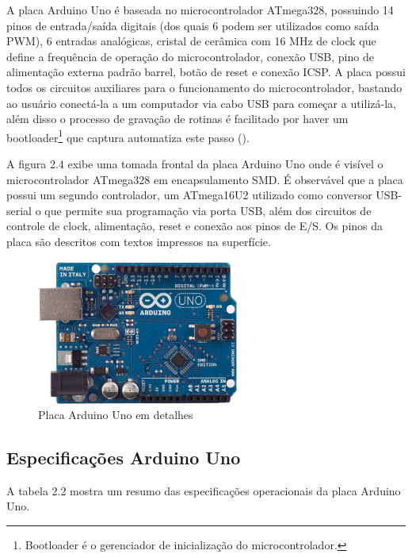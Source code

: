 A placa Arduino Uno é baseada no microcontrolador ATmega328, possuindo 14 pinos de entrada/saída digitais (dos quais 6 podem ser utilizados como saída PWM), 6 entradas analógicas, cristal de cerâmica com 16 MHz de clock que define a frequência de operação do microcontrolador, conexão USB, pino de alimentação externa padrão barrel, botão de reset e conexão ICSP. A placa possui todos os circuitos auxiliares para o funcionamento do microcontrolador, bastando ao usuário conectá-la a um computador via cabo USB para começar a utilizá-la, além disso o processo de gravação de rotinas é facilitado por haver um bootloader\footnote{Bootloader é o gerenciador de inicialização do microcontrolador.} que captura automatiza este passo (\textcite{arduino_specs:2013}).

A figura 2.4 exibe uma tomada frontal da placa Arduino Uno onde é visível o microcontrolador ATmega328 em encapsulamento SMD. É observável que a placa possui um segundo controlador, um ATmega16U2 utilizado como conversor USB-serial o que permite sua programação via porta USB, além dos circuitos de controle de clock, alimentação, reset e conexão aos pinos de E/S. Os pinos da placa são descritos com textos impressos na superfície.

\begin{figure}[h!]
			\centering
			\includegraphics[width=0.6\textwidth]{figures/arduinoUnoFront.jpg}
			\caption{Placa Arduino Uno em detalhes}
			\label{1}
\end{figure}


\subsection{Especificações Arduino Uno}

A tabela 2.2 mostra um resumo das especificações operacionais da placa Arduino Uno.

